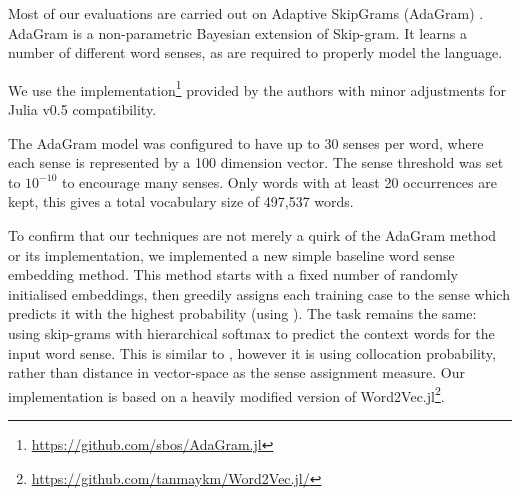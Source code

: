 {%
Most of our evaluations are carried out on Adaptive SkipGrams (AdaGram) \parencite{AdaGrams}.
AdaGram is a non-parametric Bayesian extension of Skip-gram. It learns a number of different word senses, as are required to properly model the language.

We use the implementation\footnote{\url{https://github.com/sbos/AdaGram.jl}} provided by the authors with minor adjustments for Julia \parencite{Julia} v0.5 compatibility.


The AdaGram model was configured to have up to 30 senses per word, where each sense is represented by a 100 dimension vector. 
The sense threshold was set to $10^{-10}$ to encourage many senses.
Only words with at least 20 occurrences are kept, this gives a total vocabulary size of 497,537 words.




To confirm that our techniques are not merely a quirk of the AdaGram method or its implementation, we implemented a new simple baseline word sense embedding method.
This method starts with a fixed number of randomly initialised embeddings, then greedily assigns each training case to the sense which predicts it with the highest probability (using ).
The task remains the same: using skip-grams with hierarchical softmax to predict the context words for the input word sense.
This is similar to \cite{neelakantan2015efficient}, however it is using collocation probability, rather than distance in vector-space as the sense assignment measure.
Our implementation is based on a heavily modified version of Word2Vec.jl\footnote{\url{https://github.com/tanmaykm/Word2Vec.jl/}}.

}
